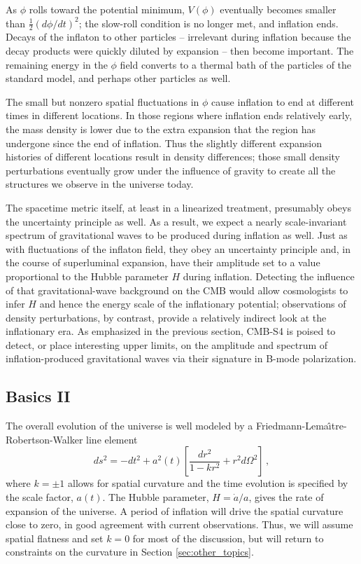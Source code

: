 As $\phi$ rolls toward the potential minimum, $V(\phi)$ eventually becomes smaller than $\frac{1}{2}(d\phi/dt)^2$; the slow-roll condition is no longer met, and inflation ends. Decays of the inflaton to other particles -- irrelevant during inflation because the decay products were quickly diluted by expansion -- then become important. The remaining energy in the $\phi$ field converts to a thermal bath of the particles of the standard model, and perhaps other particles as well.

The small but nonzero spatial fluctuations in $\phi$ cause inflation to end at different times in different locations. In those regions where inflation ends relatively early, the mass density is lower due to the extra expansion that the region has undergone since the end of inflation. Thus the slightly different expansion histories of different locations result in density differences; those small density perturbations eventually grow under the influence of gravity to create all the structures we observe in the universe today.

The spacetime metric itself, at least in a linearized treatment, presumably obeys the uncertainty principle as well. As a result, we expect a nearly scale-invariant spectrum of gravitational waves to be produced during inflation as well. Just as with fluctuations of the inflaton field, they obey an uncertainty principle and, in the course of superluminal expansion, have their amplitude set to a value proportional to the Hubble parameter $H$ during inflation. Detecting the influence of that gravitational-wave background on the CMB would allow cosmologists to infer $H$ and hence the energy scale of the inflationary potential; observations of density perturbations, by contrast, provide a relatively indirect look at the inflationary era. As emphasized in the previous section, CMB-S4 is poised to detect, or place interesting upper limits, on the amplitude and spectrum of inflation-produced gravitational waves via their signature in B-mode polarization. 


\subsection{Basics II}

The overall evolution of the universe is well modeled by a Friedmann-Lema\^{\i}tre-Robertson-Walker line element
\begin{equation}
ds^2=-dt^2+a^2(t)\left[\frac{dr^2}{1-kr^2}+r^2d\Omega^2\right]\,,
\end{equation}
where $k=\pm1$ allows for spatial curvature and the time evolution is specified by the scale factor, $a(t)$. The Hubble parameter, $H=\dot{a}/a$, gives the rate of expansion of the universe. A period of inflation will drive the spatial curvature close to zero, in good agreement with current observations. Thus, we will assume spatial flatness and set $k=0$ for most of the discussion, but will return to constraints on the curvature in Section \ref{sec:other_topics}. 

